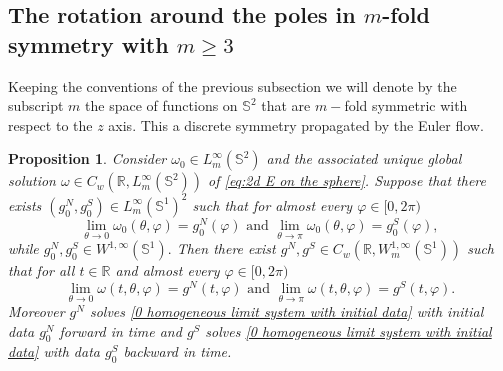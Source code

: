\documentclass[10pt]{article}
\numberwithin{equation}{section}
\theoremstyle{plain}
\newtheorem{proposition}[lemma]{Proposition}
\theoremstyle{definition}
\newcommand{\Rr}{{\mathbb R}}
\newcommand{\prt}[1]{\left( #1 \right)}
\numberwithin{equation}{section}
\begin{document}
\subsection{The rotation around the poles in $m$-fold symmetry with $m\geq 3$}
Keeping the conventions of the previous subsection we will denote by the subscript $m$ the space of functions on $\mathbb{S}^2$ that are $m-$fold symmetric with respect to the $z$ axis. This a discrete symmetry propagated by the Euler flow.
\begin{proposition}\label{prop: movement of poles}
Consider $\omega_0\in L^\infty_m(\mathbb{S}^2)$ and the associated unique global solution $\omega \in C_w\prt{\Rr,L_m^{\infty}(\mathbb{S}^2)}$ of \eqref{eq:2d E on the sphere}. Suppose that there exists $(g_0^N, g_0^S)\in L^\infty_m(\mathbb{S}^1)^2$ such that for almost every $\varphi\in[0,2\pi)$
\[
\lim_{\theta\rightarrow 0}\omega_0(\theta,\varphi)=g_0^N(\varphi) \text{ and } \lim_{\theta\rightarrow \pi}\omega_0(\theta,\varphi)=g_0^S(\varphi),
\]
while $g_0^N, g_0^S\in W^{1,\infty}(\mathbb{S}^1).$
Then there exist $g^N, g^S\in C_w\prt{\Rr,W^{1,\infty}_m(\mathbb{S}^1)}$ such that for all $t\in \Rr$ and almost every $\varphi\in[0,2\pi)$
\[
\lim_{\theta\rightarrow 0}\omega(t,\theta,\varphi)=g^N(t,\varphi) \text{ and } \lim_{\theta\rightarrow \pi}\omega(t,\theta,\varphi)=g^S(t,\varphi).
\]
Moreover $g^N$ solves \eqref{0 homogeneous limit system with initial data} with initial data $g^N_0$ forward in time and $g^S$ solves \eqref{0 homogeneous limit system with initial data} with data $g^S_0$ backward in time. 
\end{proposition}
\end{document}
